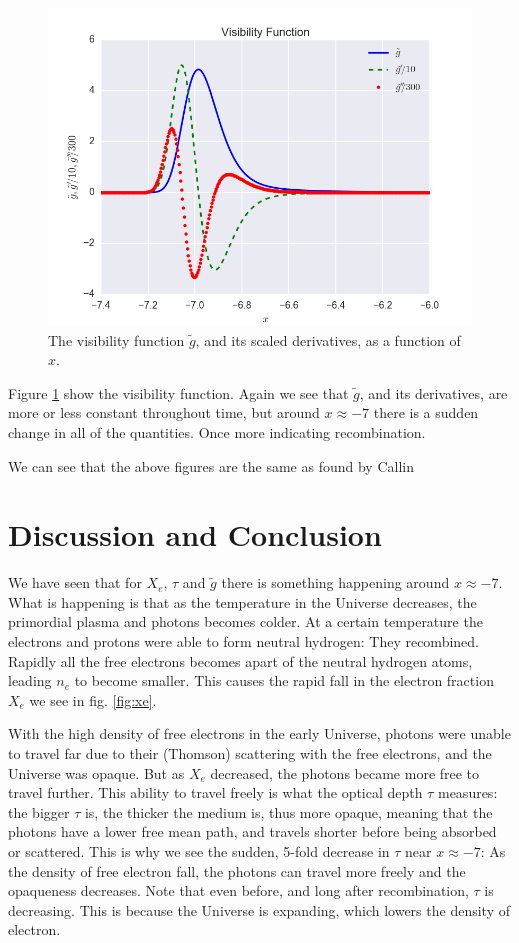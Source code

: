 \documentclass[a4paper,norsk, 10pt]{article}
\begin{document}
\begin{figure}[!htb]
\centering
\includegraphics[scale=0.5]{g.png}
\caption{The visibility function $\tilde{g}$, and its scaled derivatives, as a function of $x$.}\label{fig:g}
\end{figure}

Figure \ref{fig:g} show the visibility function. Again we see that $\tilde{g}$, and its derivatives, are more or less constant throughout time, but around $x\approx -7$ there is a sudden change in all of the quantities. Once more indicating recombination.

We can see that the above figures are the same as found by Callin \cite{callin}



\section{Discussion and Conclusion}
We have seen that for $X_e$, $\tau$ and $\tilde{g}$ there is something happening around $x\approx -7$. What is happening is that as the temperature in the Universe decreases, the primordial plasma and photons becomes colder. At a certain temperature the electrons and protons were able to form neutral hydrogen: They recombined. Rapidly all the free electrons becomes apart of the neutral hydrogen atoms, leading $n_e$ to become smaller. This causes the rapid fall in the electron fraction $X_e$ we see in fig. \ref{fig:xe}.

With the high density of free electrons in the early Universe, photons were unable to travel far due to their (Thomson) scattering with the free electrons, and the Universe was opaque. But as $X_e$ decreased, the photons became more free to travel further. This ability to travel freely is what the optical depth $\tau$ measures: the bigger $\tau$ is, the thicker the medium is, thus more opaque, meaning that the photons have a lower free mean path, and travels shorter before being absorbed or scattered. This is why we see the sudden, 5-fold decrease in $\tau$ near $x\approx -7$: As the density of free electron fall, the photons can travel more freely and the opaqueness decreases. Note that even before, and long after recombination, $\tau$ is decreasing. This is because the Universe is expanding, which lowers the density of electron.
\end{document}

